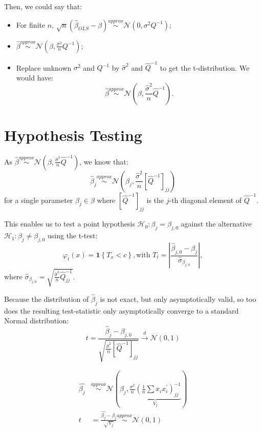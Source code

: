 Then,  we could say that:
\begin{itemize}
  \item For finite $n$, $\sqrt{n}(\hat{\beta}_{OLS} - \beta) \overset{approx}{\sim} \mathcal{N} (0, \sigma ^2 Q^{-1});$
  \item $\hat{\beta } \overset{approx}{\sim} \mathcal{N} (\beta , \frac{\sigma^2}{n} Q^{-1})$;
  \item Replace unknown $\sigma^2$ and $Q^{-1}$ by $\hat{\sigma}^2$ and $\hat{Q}^{-1}$ to get the t-distribution.
  We would have: \[\hat{\beta } \overset{approx}{\sim} \mathcal{N} \left(\beta , \frac{\hat{\sigma}^2}{n} \hat{Q}^{-1}\right).\]
\end{itemize}

\section{Hypothesis Testing}
As $\hat{\beta } \overset{approx}{\sim} \mathcal{N} \left(\beta , \frac{\hat{\sigma}^2}{n} \hat{Q}^{-1}\right)$,
we know that:
\[\hat{\beta}_j \overset{approx}{\sim} \mathcal{N}(\beta_{j}, \frac{\hat{\sigma}^2}{n}[\hat{Q}^{-1}]_{jj})\] for a single parameter $\beta_j \in \beta$
where $[\hat{Q}^{-1}]_{jj}$ is the $j$-th diagonal element of $\hat{Q}^{-1}$.

This enables us to test a point hypothesis $\mathcal{H}_{0}: \beta_j = \beta_{j, 0}$ against the alternative $\mathcal{H}_{1}: \beta_j \neq \beta_{j, 0}$ using the t-test:
\[\varphi_t(x) =\mathbf{1}\left\{T_x < c\right\}, \text{with } T_t = \left| \frac{\hat{\beta}_{j,0} - \beta_j}{\hat{\sigma}_{\beta_{j,0}}} \right|,\]
where $\hat{\sigma}_{\beta_{j,0}} = \sqrt{\frac{\hat{\sigma}^2}{n}\hat{Q}_{jj}^{-1}}.$

Because the distribution of $\hat{\beta}_j$ is not exact, but only asymptotically valid, so too does the
resulting test-statistic only asymptotically converge to a standard Normal distribution:
\[t = \frac{\hat{\beta}_j - \beta_{j, 0}}{\sqrt{\frac{\hat{\sigma}^2}{n}[\hat{Q}^{-1}]_{jj}}} \overset{d}{\rightarrow} \mathcal{N}(0, 1)\]

\begin{align*}
  \hat{\beta _j} &\overset{approx}{\sim} \mathcal{N} \left(\beta _j , \underset{V_j}{\underbrace{\frac{\sigma^2}{n}\left(\frac{1}{n} \sum{x_i x_i^{\prime} }\right)^{-1}_{jj}}} \right)\\
  t &= \frac{\hat{\beta _j} - \beta _j}{\sqrt{V_j}} \overset{approx}{\sim} \mathcal{N} (0, 1)\\
\end{align*}

